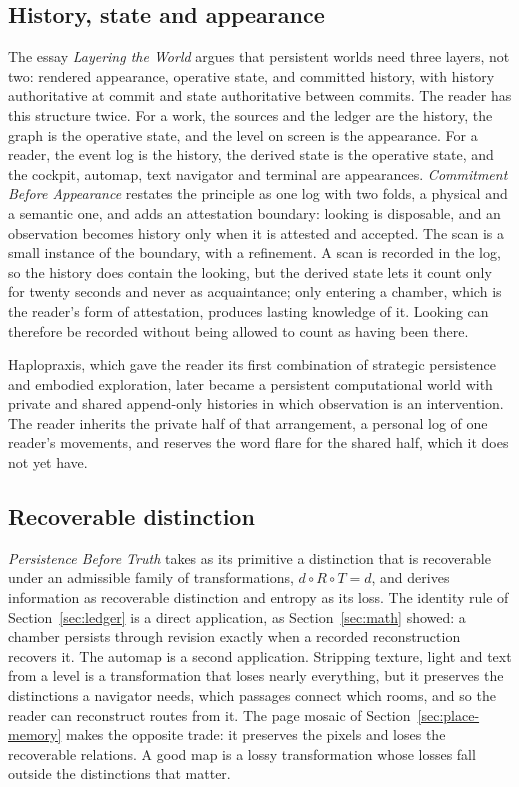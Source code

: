 \documentclass[11pt]{article}
\theoremstyle{remark}
\begin{document}
\subsection{History, state and appearance}

The essay \emph{Layering the World} argues that persistent worlds need three layers, not two: rendered appearance, operative state, and committed history, with history authoritative at commit and state authoritative between commits. The reader has this structure twice. For a work, the sources and the ledger are the history, the graph is the operative state, and the level on screen is the appearance. For a reader, the event log is the history, the derived state is the operative state, and the cockpit, automap, text navigator and terminal are appearances. \emph{Commitment Before Appearance} restates the principle as one log with two folds, a physical and a semantic one, and adds an attestation boundary: looking is disposable, and an observation becomes history only when it is attested and accepted. The scan is a small instance of the boundary, with a refinement. A scan is recorded in the log, so the history does contain the looking, but the derived state lets it count only for twenty seconds and never as acquaintance; only entering a chamber, which is the reader's form of attestation, produces lasting knowledge of it. Looking can therefore be recorded without being allowed to count as having been there.

Haplopraxis, which gave the reader its first combination of strategic persistence and embodied exploration, later became a persistent computational world with private and shared append-only histories in which observation is an intervention. The reader inherits the private half of that arrangement, a personal log of one reader's movements, and reserves the word flare for the shared half, which it does not yet have.

\subsection{Recoverable distinction}

\emph{Persistence Before Truth} takes as its primitive a distinction that is recoverable under an admissible family of transformations, $d \circ R \circ T = d$, and derives information as recoverable distinction and entropy as its loss. The identity rule of Section~\ref{sec:ledger} is a direct application, as Section~\ref{sec:math} showed: a chamber persists through revision exactly when a recorded reconstruction recovers it. The automap is a second application. Stripping texture, light and text from a level is a transformation that loses nearly everything, but it preserves the distinctions a navigator needs, which passages connect which rooms, and so the reader can reconstruct routes from it. The page mosaic of Section~\ref{sec:place-memory} makes the opposite trade: it preserves the pixels and loses the recoverable relations. A good map is a lossy transformation whose losses fall outside the distinctions that matter.
\end{document}
